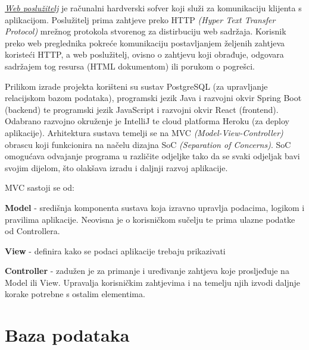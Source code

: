 		\textit{\underline{Web poslužitelj}} je računalni hardverski sofver koji služi za komunikaciju klijenta s aplikacijom. Poslužitelj prima zahtjeve preko HTTP \textit{(Hyper Text Transfer Protocol)} mrežnog protokola stvorenog za distirbuciju web sadržaja. Korisnik preko web preglednika pokreće komunikaciju postavljanjem željenih zahtjeva koristeći HTTP, a web poslužitelj, ovisno o zahtjevu koji obrađuje, odgovara sadržajem tog resursa (HTML dokumentom) ili porukom o pogrešci.
		
		Prilikom izrade projekta korišteni su sustav PostgreSQL (za upravljanje relacijskom bazom podataka), programski jezik Java i razvojni okvir Spring Boot (backend) te programski jezik JavaScript i razvojni okvir React (frontend). Odabrano razvojno okruženje je IntelliJ te cloud platforma Heroku (za deploy aplikacije). Arhitektura sustava temelji se na MVC \textit{(Model-View-Controller)} obrascu koji funkcionira na načelu dizajna SoC \textit{(Separation of Concerns)}. SoC omogućava odvajanje programa u različite odjeljke tako da se svaki odjeljak bavi svojim dijelom, što olakšava izradu i daljnji razvoj aplikacije.
		
		MVC sastoji se od:
		\begin{packed_item}
			\item \textbf{Model} - središnja komponenta sustava koja izravno upravlja podacima, logikom i pravilima aplikacije. Neovisna je o korisničkom sučelju te prima ulazne podatke od Controllera.
			
			\item \textbf{View} - definira kako se podaci aplikacije trebaju prikazivati
			
			\item \textbf{Controller} - zadužen je za primanje i uređivanje zahtjeva koje prosljeđuje na Model ili View. Upravalja korisničkim zahtjevima i na temelju njih izvodi daljnje korake potrebne s ostalim elementima.
		\end{packed_item}
		
		\eject
		

				
		\section{Baza podataka}
			
%			

